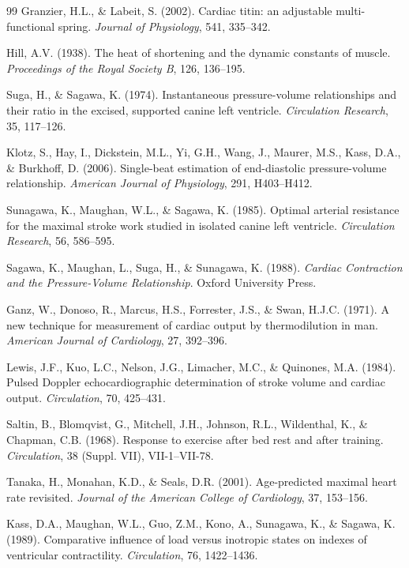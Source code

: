\documentclass[12pt,a4paper]{article}
\theoremstyle{remark}
\begin{document}
\begin{thebibliography}{99}
Granzier, H.L., \& Labeit, S. (2002). Cardiac titin: an adjustable multi-functional spring. \textit{Journal of Physiology}, 541, 335--342.

Hill, A.V. (1938). The heat of shortening and the dynamic constants of muscle. \textit{Proceedings of the Royal Society B}, 126, 136--195.

Suga, H., \& Sagawa, K. (1974). Instantaneous pressure-volume relationships and their ratio in the excised, supported canine left ventricle. \textit{Circulation Research}, 35, 117--126.

Klotz, S., Hay, I., Dickstein, M.L., Yi, G.H., Wang, J., Maurer, M.S., Kass, D.A., \& Burkhoff, D. (2006). Single-beat estimation of end-diastolic pressure-volume relationship. \textit{American Journal of Physiology}, 291, H403--H412.

Sunagawa, K., Maughan, W.L., \& Sagawa, K. (1985). Optimal arterial resistance for the maximal stroke work studied in isolated canine left ventricle. \textit{Circulation Research}, 56, 586--595.

Sagawa, K., Maughan, L., Suga, H., \& Sunagawa, K. (1988). \textit{Cardiac Contraction and the Pressure-Volume Relationship}. Oxford University Press.

Ganz, W., Donoso, R., Marcus, H.S., Forrester, J.S., \& Swan, H.J.C. (1971). A new technique for measurement of cardiac output by thermodilution in man. \textit{American Journal of Cardiology}, 27, 392--396.

Lewis, J.F., Kuo, L.C., Nelson, J.G., Limacher, M.C., \& Quinones, M.A. (1984). Pulsed Doppler echocardiographic determination of stroke volume and cardiac output. \textit{Circulation}, 70, 425--431.

Saltin, B., Blomqvist, G., Mitchell, J.H., Johnson, R.L., Wildenthal, K., \& Chapman, C.B. (1968). Response to exercise after bed rest and after training. \textit{Circulation}, 38 (Suppl. VII), VII-1--VII-78.

Tanaka, H., Monahan, K.D., \& Seals, D.R. (2001). Age-predicted maximal heart rate revisited. \textit{Journal of the American College of Cardiology}, 37, 153--156.

Kass, D.A., Maughan, W.L., Guo, Z.M., Kono, A., Sunagawa, K., \& Sagawa, K. (1989). Comparative influence of load versus inotropic states on indexes of ventricular contractility. \textit{Circulation}, 76, 1422--1436.


\end{thebibliography}
\end{document}
